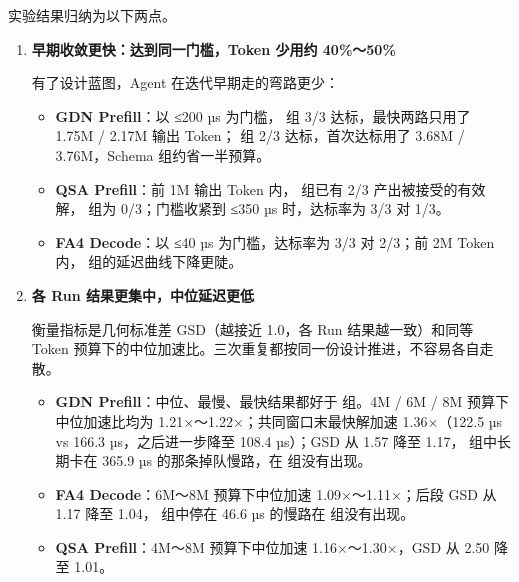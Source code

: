 实验结果归纳为以下两点。


\begin{enumerate}[start=1]
\item
\textbf{早期收敛更快：达到同一门槛，Token 少用约 40\%～50\%}


有了设计蓝图，Agent 在迭代早期走的弯路更少：


\begin{itemize}
\item
\textbf{GDN Prefill}：以 ≤200 µs 为门槛， 组 3/3 达标，最快两路只用了 1.75M / 2.17M 输出 Token； 组 2/3 达标，首次达标用了 3.68M / 3.76M，Schema 组约省一半预算。


\item
\textbf{QSA Prefill}：前 1M 输出 Token 内， 组已有 2/3 产出被接受的有效解， 组为 0/3；门槛收紧到 ≤350 µs 时，达标率为 3/3 对 1/3。


\item
\textbf{FA4 Decode}：以 ≤40 µs 为门槛，达标率为 3/3 对 2/3；前 2M Token 内， 组的延迟曲线下降更陡。


\end{itemize}
\item
\textbf{各 Run 结果更集中，中位延迟更低}


衡量指标是几何标准差 GSD（越接近 1.0，各 Run 结果越一致）和同等 Token 预算下的中位加速比。三次重复都按同一份设计推进，不容易各自走散。


\begin{itemize}
\item
\textbf{GDN Prefill}：中位、最慢、最快结果都好于  组。4M / 6M / 8M 预算下中位加速比均为 1.21×～1.22×；共同窗口末最快解加速 1.36×（122.5 µs vs 166.3 µs，之后进一步降至 108.4 µs）；GSD 从 1.57 降至 1.17， 组中长期卡在 365.9 µs 的那条掉队慢路，在  组没有出现。


\item
\textbf{FA4 Decode}：6M～8M 预算下中位加速 1.09×～1.11×；后段 GSD 从 1.17 降至 1.04， 组中停在 46.6 µs 的慢路在  组没有出现。


\item
\textbf{QSA Prefill}：4M～8M 预算下中位加速 1.16×～1.30×，GSD 从 2.50 降至 1.01。


\end{itemize}
\end{enumerate}

